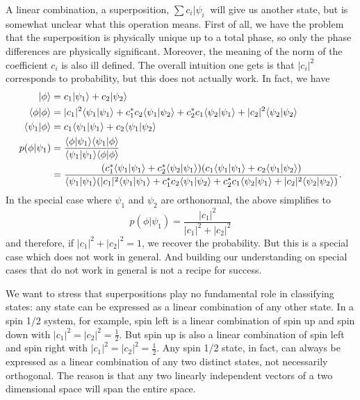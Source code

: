 A linear combination, a superposition, $\sum c_i | \psi_i \>$ will give us another state, but is somewhat unclear what this operation means. First of all, we have the problem that the superposition is physically unique up to a total phase, so only the phase differences are physically significant. Moreover, the meaning of the norm of the coefficient $c_i$ is also ill defined. The overall intuition one gets is that $|c_i|^2$ corresponds to probability, but this does not actually work. In fact, we have
\begin{equation}
	\begin{aligned}
		|\phi\rangle &= c_1 |\psi_1\rangle + c_2 | \psi_2\rangle \\
		\langle \phi | \phi\rangle &= |c_1|^2 \langle \psi_1 |\psi_1\rangle + c_1^* c_2 \langle \psi_1 |\psi_2\rangle + c_2^* c_1 \langle \psi_2 |\psi_1\rangle + |c_2|^2 \langle \psi_2 |\psi_2\rangle \\
		\langle \psi_1 | \phi\rangle &= c_1 \langle \psi_1 |\psi_1\rangle + c_2 \langle \psi_1 |\psi_2\rangle \\
		p(\phi|\psi_1) &= \frac{\langle \phi | \psi_1 \rangle\langle \psi_1 | \phi \rangle}{\langle \psi_1 | \psi_1 \rangle\langle \phi | \phi \rangle} \\
		&= \frac{(c_1^* \langle \psi_1 |\psi_1\rangle + c_2^* \langle \psi_2 |\psi_1\rangle)(c_1 \langle \psi_1 |\psi_1\rangle + c_2 \langle \psi_1 |\psi_2\rangle)}{\langle \psi_1 | \psi_1 \rangle(|c_1|^2 \langle \psi_1 |\psi_1\rangle + c_1^* c_2 \langle \psi_1 |\psi_2\rangle + c_2^* c_1 \langle \psi_2 |\psi_1\rangle + |c_2|^2 \langle \psi_2 |\psi_2\rangle)}.
	\end{aligned}
\end{equation}
In the special case where $\psi_1$ and $\psi_2$ are orthonormal, the above simplifies to
\begin{equation}
	p(\phi|\psi_1) = \frac{|c_1|^2}{|c_1|^2 + |c_2|^2}
\end{equation}
and therefore, if $|c_1|^2 + |c_2|^2 = 1$, we recover the probability. But this is a special case which does not work in general. And building our understanding on special cases that do not work in general is not a recipe for success.

We want to stress that superpositions play no fundamental role in classifying states: any state can be expressed as a linear combination of any other state. In a spin 1/2 system, for example, spin left is a linear combination of spin up and spin down with $|c_1|^2=|c_2|^2=\frac{1}{2}$. But spin up is also a linear combination of spin left and spin right with $|c_1|^2=|c_2|^2=\frac{1}{2}$. Any spin 1/2 state, in fact, can always be expressed as a linear combination of any two distinct states, not necessarily orthogonal. The reason is that any two linearly independent vectors of a two dimensional space will span the entire space.

